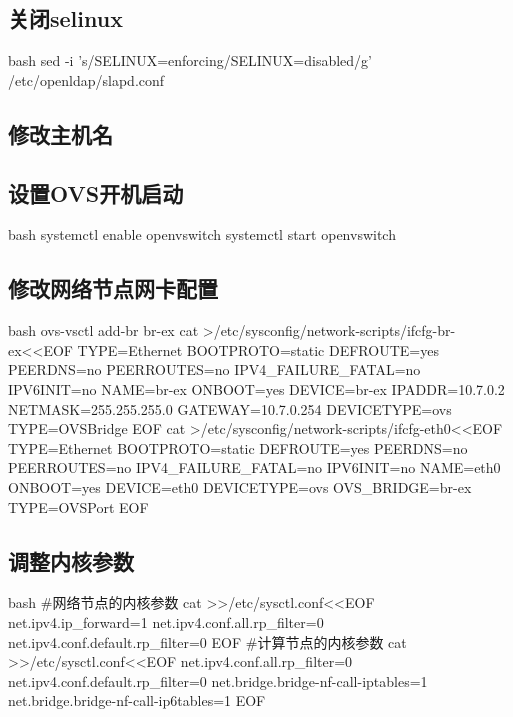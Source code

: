 \subsection{关闭selinux}
\begin{code-block}{bash}
sed -i 's/SELINUX=enforcing/SELINUX=disabled/g' /etc/openldap/slapd.conf
\end{code-block}

\subsection{修改主机名}

\subsection{设置OVS开机启动}
\begin{code-block}{bash}
systemctl enable openvswitch
systemctl start openvswitch
\end{code-block}
    
\subsection{修改网络节点网卡配置}
\begin{code-block}{bash}
ovs-vsctl add-br br-ex
cat >/etc/sysconfig/network-scripts/ifcfg-br-ex<<EOF
TYPE=Ethernet
BOOTPROTO=static
DEFROUTE=yes
PEERDNS=no
PEERROUTES=no
IPV4_FAILURE_FATAL=no
IPV6INIT=no
NAME=br-ex
ONBOOT=yes
DEVICE=br-ex
IPADDR=10.7.0.2
NETMASK=255.255.255.0
GATEWAY=10.7.0.254
DEVICETYPE=ovs
TYPE=OVSBridge
EOF
cat >/etc/sysconfig/network-scripts/ifcfg-eth0<<EOF
TYPE=Ethernet
BOOTPROTO=static
DEFROUTE=yes
PEERDNS=no
PEERROUTES=no
IPV4_FAILURE_FATAL=no
IPV6INIT=no
NAME=eth0
ONBOOT=yes
DEVICE=eth0
DEVICETYPE=ovs
OVS_BRIDGE=br-ex
TYPE=OVSPort
EOF
\end{code-block}

\subsection{调整内核参数}
\begin{code-block}{bash}
#网络节点的内核参数
cat >>/etc/sysctl.conf<<EOF
net.ipv4.ip_forward=1
net.ipv4.conf.all.rp_filter=0
net.ipv4.conf.default.rp_filter=0
EOF
#计算节点的内核参数
cat >>/etc/sysctl.conf<<EOF
net.ipv4.conf.all.rp_filter=0
net.ipv4.conf.default.rp_filter=0
net.bridge.bridge-nf-call-iptables=1
net.bridge.bridge-nf-call-ip6tables=1
EOF
\end{code-block}

